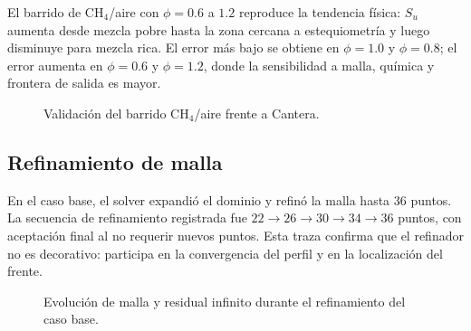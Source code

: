 \documentclass[12pt,a4paper]{article}
\begin{document}
El barrido de CH$_4$/aire con $\phi=0.6$ a $1.2$ reproduce la tendencia física: $S_u$ aumenta desde mezcla pobre hasta la zona cercana a estequiometría y luego disminuye para mezcla rica. El error más bajo se obtiene en $\phi=1.0$ y $\phi=0.8$; el error aumenta en $\phi=0.6$ y $\phi=1.2$, donde la sensibilidad a malla, química y frontera de salida es mayor.

\begin{figure}[H]
  \centering
  \caption{Validación del barrido CH$_4$/aire frente a Cantera.}
  \label{fig:phi_sweep}
\end{figure}

\subsection{Refinamiento de malla}

En el caso base, el solver expandió el dominio y refinó la malla hasta 36 puntos. La secuencia de refinamiento registrada fue $22\rightarrow 26\rightarrow 30\rightarrow 34\rightarrow 36$ puntos, con aceptación final al no requerir nuevos puntos. Esta traza confirma que el refinador no es decorativo: participa en la convergencia del perfil y en la localización del frente.

\begin{figure}[H]
  \centering
  \caption{Evolución de malla y residual infinito durante el refinamiento del caso base.}
  \label{fig:refinement}
\end{figure}
\end{document}

